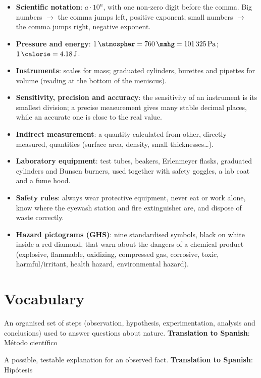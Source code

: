 \begin{itemize}
    \item \textbf{Scientific notation}: \(a \cdot 10^{n}\), with one non-zero digit before the comma. Big numbers \(\to\) the comma jumps left, positive exponent; small numbers \(\to\) the comma jumps right, negative exponent.
    \item \textbf{Pressure and energy}: \(\qty{1}{\atmospher} = \qty{760}{\mmhg} = \qty{101325}{\Pa}\); \(\qty{1}{\calorie} = \qty{4.18}{\J}\).
    \item \textbf{Instruments}: scales for mass; graduated cylinders, burettes and pipettes for volume (reading at the bottom of the meniscus).
    \item \textbf{Sensitivity, precision and accuracy}: the sensitivity of an instrument is its smallest division; a precise measurement gives many stable decimal places, while an accurate one is close to the real value.
    \item \textbf{Indirect measurement}: a quantity calculated from other, directly measured, quantities (surface area, density, small thicknesses\ldots).
    \item \textbf{Laboratory equipment}: test tubes, beakers, Erlenmeyer flasks, graduated cylinders and Bunsen burners, used together with safety goggles, a lab coat and a fume hood.
    \item \textbf{Safety rules}: always wear protective equipment, never eat or work alone, know where the eyewash station and fire extinguisher are, and dispose of waste correctly.
    \item \textbf{Hazard pictograms (GHS)}: nine standardised symbols, black on white inside a red diamond, that warn about the dangers of a chemical product (explosive, flammable, oxidizing, compressed gas, corrosive, toxic, harmful/irritant, health hazard, environmental hazard).
\end{itemize}

\section{Vocabulary}

\begin{vocabulary}
    An organised set of steps (observation, hypothesis, experimentation, analysis and conclusions) used to answer questions about nature. \newline
    \textbf{Translation to Spanish}: Método científico
\end{vocabulary}

\begin{vocabulary}[Hypothesis]
    A possible, testable explanation for an observed fact. \newline
    \textbf{Translation to Spanish}: Hipótesis
\end{vocabulary}

